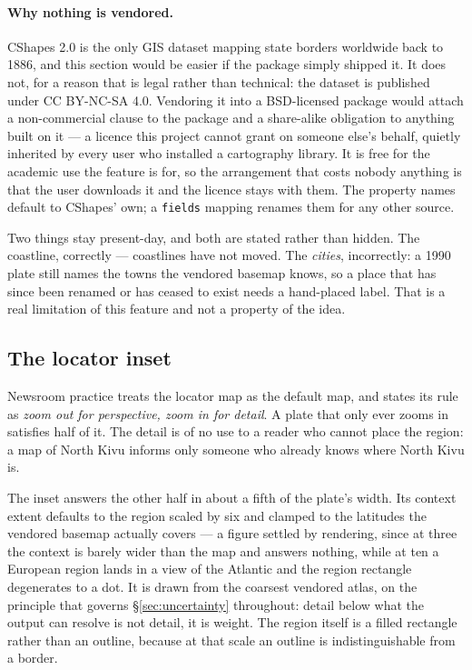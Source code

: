 \documentclass[11pt]{article}
\begin{document}
\paragraph{Why nothing is vendored.} CShapes 2.0
\parencite{schvitz-cshapes} is the only GIS dataset mapping state borders
worldwide back to 1886, and this section would be easier if the package simply
shipped it. It does not, for a reason that is legal rather than technical: the
dataset is published under CC BY-NC-SA 4.0. Vendoring it into a BSD-licensed
package would attach a non-commercial clause to the package and a share-alike
obligation to anything built on it --- a licence this project cannot grant on
someone else's behalf, quietly inherited by every user who installed a
cartography library. It is free for the academic use the feature is for, so
the arrangement that costs nobody anything is that the user downloads it and
the licence stays with them. The property names default to CShapes' own; a
\texttt{fields} mapping renames them for any other source.

Two things stay present-day, and both are stated rather than hidden. The
coastline, correctly --- coastlines have not moved. The \emph{cities},
incorrectly: a 1990 plate still names the towns the vendored basemap knows, so
a place that has since been renamed or has ceased to exist needs a hand-placed
label. That is a real limitation of this feature and not a property of the
idea.

\subsection{The locator inset}

Newsroom practice treats the locator map as the default map, and states its
rule as \emph{zoom out for perspective, zoom in for detail}. A plate that
only ever zooms in satisfies half of it. The detail is of no use to a reader
who cannot place the region: a map of North Kivu informs only someone who
already knows where North Kivu is.

The inset answers the other half in about a fifth of the plate's width. Its
context extent defaults to the region scaled by six and clamped to the
latitudes the vendored basemap actually covers --- a figure settled by
rendering, since at three the context is barely wider than the map and
answers nothing, while at ten a European region lands in a view of the
Atlantic and the region rectangle degenerates to a dot. It is drawn from the
coarsest vendored atlas, on the principle that governs
\S\ref{sec:uncertainty} throughout: detail below what the output can resolve
is not detail, it is weight. The region itself is a filled rectangle rather
than an outline, because at that scale an outline is indistinguishable from
a border.
\end{document}
